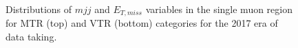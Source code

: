 \begin{figure}[htbp]
{    }
  \caption{Distributions of $mjj$ and $E_{T,miss}$ variables in the single muon region for MTR (top) and VTR (bottom) categories for the 2017 era of data taking.}
  \label{fig:2017_Wmunu_1}
\end{figure}

